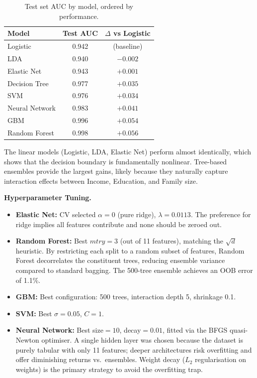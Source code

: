 \begin{table}[tb]
\centering
\caption{Test set AUC by model, ordered by performance.}
\label{tab:improvements}
\begin{tabular}{@{}lcc@{}}
\toprule
Model & Test AUC & $\Delta$ vs Logistic \\
\midrule
Logistic       & 0.942 & (baseline) \\
LDA            & 0.940 & $-0.002$ \\
Elastic Net    & 0.943 & $+0.001$ \\
Decision Tree  & 0.977 & $+0.035$ \\
SVM            & 0.976 & $+0.034$ \\
Neural Network & 0.983 & $+0.041$ \\
GBM            & 0.996 & $+0.054$ \\
Random Forest  & 0.998 & $+0.056$ \\
\bottomrule
\end{tabular}
\end{table}

The linear models (Logistic, LDA, Elastic Net) perform almost identically, which shows that the decision boundary is fundamentally nonlinear. Tree-based ensembles provide the largest gains, likely because they naturally capture interaction effects between Income, Education, and Family size.

\noindent\textbf{Hyperparameter Tuning.}
\begin{itemize}
    \item \textbf{Elastic Net:} CV selected $\alpha=0$ (pure ridge), $\lambda=0.0113$. The preference for ridge implies all features contribute and none should be zeroed out.
    \item \textbf{Random Forest:} Best $mtry=3$ (out of 11 features), matching the $\sqrt{d}$ heuristic. By restricting each split to a random subset of features, Random Forest decorrelates the constituent trees, reducing ensemble variance compared to standard bagging. The 500-tree ensemble achieves an OOB error of 1.1\%.
    \item \textbf{GBM:} Best configuration: 500 trees, interaction depth 5, shrinkage 0.1.
    \item \textbf{SVM:} Best $\sigma=0.05$, $C=1$.
    \item \textbf{Neural Network:} Best size$=10$, decay$=0.01$, fitted via the BFGS quasi-Newton optimiser. A single hidden layer was chosen because the dataset is purely tabular with only 11 features; deeper architectures risk overfitting and offer diminishing returns vs.\ ensembles. Weight decay ($L_2$ regularisation on weights) is the primary strategy to avoid the overfitting trap.
\end{itemize}

